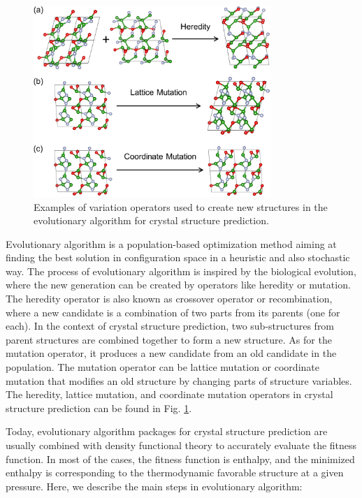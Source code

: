     \begin{figure}[htbp]
        \centering
        \captionsetup{singlelinecheck = false, justification=justified}
        \includegraphics[width=0.8\textwidth]{operators.png}
        \caption[Examples of variation operators in evolutionary algorithm]{Examples of variation operators used to create new structures in the evolutionary algorithm for crystal structure prediction.}
        \label{fig:operators}
    \end{figure}

Evolutionary algorithm is a population-based optimization method aiming at finding the best solution in configuration space in a heuristic and also stochastic way. The process of evolutionary algorithm is inspired by the biological evolution, where the new generation can be created by operators like heredity or mutation. The heredity operator is also known as crossover operator or recombination, where a new candidate is a combination of two parts from its parents (one for each). In the context of crystal structure prediction, two sub-structures from parent structures are combined together to form a new structure. As for the mutation operator, it produces a new candidate from an old candidate in the population. The mutation operator can be lattice mutation or coordinate mutation that modifies an old structure by changing parts of structure variables. The heredity, lattice mutation, and coordinate mutation operators in crystal structure prediction can be found in Fig. \ref{fig:operators}.


Today, evolutionary algorithm packages for crystal structure prediction are usually combined with density functional theory to accurately evaluate the fitness function. In most of the cases, the fitness function is enthalpy, and the minimized enthalpy is corresponding to the thermodynamic favorable structure at a given pressure. Here, we describe the main steps in evolutionary algorithm:

